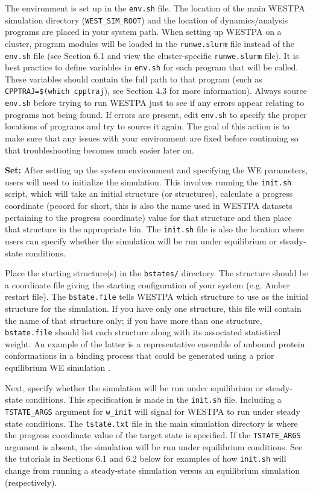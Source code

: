 \documentclass[9pt,tutorial]{livecoms}
\begin{document}
The environment is set up in the \verb|env.sh| file. 
The location of the main WESTPA simulation directory (\verb|WEST_SIM_ROOT|) and the location of dynamics/analysis programs are placed in your system path. 
When setting up WESTPA on a cluster, program modules will be loaded in the \verb|runwe.slurm| file instead of the \verb|env.sh| file (see Section 6.1 and view the cluster-specific \verb|runwe.slurm| file). 
It is best practice to define variables in \verb|env.sh| for each program that will be called. 
These variables should contain the full path to that program (such as \verb|CPPTRAJ=$(which cpptraj|), see Section 4.3 for more information). 
Always source \verb|env.sh| before trying to run WESTPA just to see if any errors appear relating to programs not being found. 
If errors are present, edit \verb|env.sh| to specify the proper locations of programs and try to source it again. 
The goal of this action is to make sure that any issues with your environment are fixed before continuing so that troubleshooting becomes much easier later on. 

\textbf{Set:} After setting up the system environment and specifying the WE parameters, users will need to initialize the simulation. 
This involves running the \verb|init.sh| script, which will take an initial structure (or structures), calculate a progress coordinate (pcoord for short, this is also the name used in WESTPA datasets pertaining to the progress coordinate) value for that structure and then place that structure in the appropriate bin. 
The \verb|init.sh| file is also the location where users can specify whether the simulation will be run under equilibrium or steady-state conditions. 

Place the starting structure(s) in the \verb|bstates/| directory. 
The structure should be a coordinate file giving the starting configuration of your system (e.g. Amber restart file). 
The \verb|bstate.file| tells WESTPA which structure to use as the initial structure for the simulation. 
If you have only one structure, this file will contain the name of that structure only; if you have more than one structure, \verb|bstate.file| should list each structure along with its associated statistical weight. 
An example of the latter is a representative ensemble of unbound protein conformations in a binding process that could be generated using a prior equilibrium WE simulation \citep{Zwier2016,Saglam2019}. 

Next, specify whether the simulation will be run under equilibrium or steady-state conditions. 
This specification is made in the \verb|init.sh| file. 
Including a \verb|TSTATE_ARGS| argument for \verb|w_init| will signal for WESTPA to run under steady state conditions. 
The \verb|tstate.txt| file in the main simulation directory is where the progress coordinate value of the target state is specified. 
If the \verb|TSTATE_ARGS| argument is absent, the simulation will be run under equilibrium conditions. 
See the tutorials in Sections 6.1 and 6.2 below for examples of how \verb|init.sh| will change from running a steady-state simulation versus an equilibrium simulation (respectively).
\end{document}
